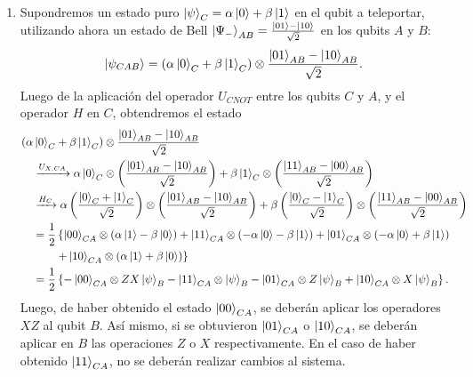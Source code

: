 \documentclass{scrartcl}
\newcommand{\inv}[1]{\frac{1}{#1}}
\DeclareRobustCommand{\[}{\begin{equation}}
\DeclareRobustCommand{\]}{\end{equation}}
\begin{document}
\begin{enumerate}
\begin{enumerate}
        
        \item Supondremos un estado puro $\ket{\psi}_C = \alpha \ket{0} + \beta \ket{1}$ en el qubit a teleportar, utilizando ahora un estado de Bell $\ket{\Psi_-}_{AB} = \frac{\ket{01} - \ket{10}}{\sqrt{2}}$ en los qubits $A$ y $B$:
        \[ \ket{\psi_{CAB}} = (\alpha \ket{0}_C + \beta \ket{1}_C) \otimes \frac{\ket{01}_{AB} - \ket{10}_{AB}}{\sqrt{2}}. \]
        Luego de la aplicación del operador $U_{CNOT}$ entre los qubits $C$ y $A$, y el operador $H$ en $C$, obtendremos el estado
        \begin{align}
            &(\alpha \ket{0}_C + \beta \ket{1}_C) \otimes \frac{\ket{01}_{AB} - \ket{10}_{AB}}{\sqrt{2}} \\
            &\quad \xrightarrow{U_{X, CA}} \alpha \ket{0}_C \otimes \left( \frac{\ket{01}_{AB} - \ket{10}_{AB}}{\sqrt{2}} \right) + \beta \ket{1}_C \otimes \left( \frac{\ket{11}_{AB} - \ket{00}_{AB}}{\sqrt{2}} \right) \\
            &\quad \xrightarrow{H_{C}} \alpha \left(\frac{\ket{0}_C + \ket{1}_C}{\sqrt{2}} \right) \otimes \left( \frac{\ket{01}_{AB} - \ket{10}_{AB}}{\sqrt{2}} \right) + \beta \left(\frac{\ket{0}_C - \ket{1}_C}{\sqrt{2}} \right) \otimes \left( \frac{\ket{11}_{AB} - \ket{00}_{AB}}{\sqrt{2}} \right) \\
            &\quad = \inv{2} \left\{ \ket{00}_{CA} \otimes (\alpha \ket{1} - \beta \ket{0}) + \ket{11}_{CA} \otimes (-\alpha \ket{0} - \beta \ket{1}) + \ket{01}_{CA} \otimes (-\alpha \ket{0} + \beta \ket{1}) \right. \\
            &\quad \quad \quad \left. + \ket{10}_{CA} \otimes (\alpha \ket{1} + \beta \ket{0}) \right\} \\
            &\quad = \inv{2} \left\{ -\ket{00}_{CA} \otimes ZX \ket{\psi}_B - \ket{11}_{CA} \otimes \ket{\psi}_B - \ket{01}_{CA} \otimes Z \ket{\psi}_B + \ket{10}_{CA} \otimes X \ket{\psi}_B \right\}.
        \end{align}
        Luego, de haber obtenido el estado $\ket{00}_{CA}$, se deberán aplicar los operadores $XZ$ al qubit $B$. Así mismo, si se obtuvieron $\ket{01}_{CA}$ o $\ket{10}_{CA}$, se deberán aplicar en $B$ las operaciones $Z$ o $X$ respectivamente. En el caso de haber obtenido $\ket{11}_{CA}$, no se deberán realizar cambios al sistema.
        
    \end{enumerate}
    
    
\end{enumerate}
\end{document}
